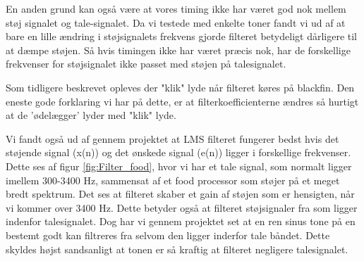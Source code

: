 \begin{description}[align=left]
En anden grund kan også være at vores timing ikke har været god nok mellem støj signalet og tale-signalet. Da vi testede med enkelte toner fandt vi ud af at bare en lille ændring i støjsignalets frekvens gjorde filteret betydeligt dårligere til at dæmpe støjen. Så hvis timingen ikke har været præcis nok, har de forskellige frekvenser for støjsignalet ikke passet med støjen på talesignalet.
\item ["klik" lyde.] Som tidligere beskrevet opleves der "klik" lyde når filteret køres på blackfin. Den eneste gode forklaring vi har på dette, er at filterkoefficienterne ændres så hurtigt at de 'ødelægger' lyder med "klik" lyde. 
\item [Bedst udenfor 300-3400 Hz.] Vi fandt også ud af gennem projektet at LMS filteret fungerer bedst hvis det støjende signal (x(n)) og det ønskede signal (e(n)) ligger i forskellige frekvenser. Dette ses af figur \ref{fig:Filter_food}, hvor vi har et tale signal, som normalt ligger imellem 300-3400 Hz, sammensat af et food processor som støjer på et meget bredt spektrum. Det ses at filteret skaber et gain af støjen som er hensigten, når vi kommer over 3400 Hz. Dette betyder også at filteret støjsignaler fra som ligger indenfor talesignalet. Dog har vi gennem projektet set at en ren sinus tone på en bestemt godt kan filtreres fra selvom den ligger inderfor tale båndet. Dette skyldes højst sandsanligt at tonen er så kraftig at filteret negligere talesignalet. 
\end{description}